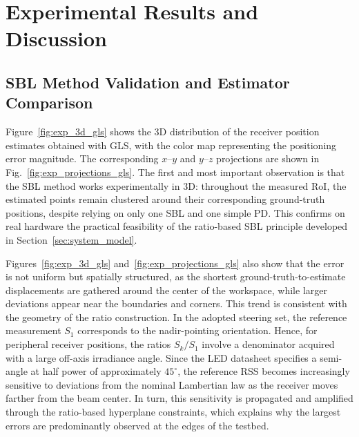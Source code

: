 \documentclass[conference]{IEEEtran}
\begin{document}
\section{Experimental Results and Discussion}
\label{sec:results}


\subsection{SBL Method Validation and Estimator Comparison}
\label{subsec:sbl_validation_gls_wls}

Figure~\ref{fig:exp_3d_gls} shows the 3D distribution of the receiver position estimates obtained with GLS, with the color map representing the positioning error magnitude. The corresponding $x$--$y$ and $y$--$z$ projections are shown in Fig.~\ref{fig:exp_projections_gls}. The first and most important observation is that the SBL method works experimentally in 3D: throughout the measured RoI, the estimated points remain clustered around their corresponding ground-truth positions, despite relying on only one SBL and one simple PD. This confirms on real hardware the practical feasibility of the ratio-based SBL principle developed in Section~\ref{sec:system_model}.

Figures~\ref{fig:exp_3d_gls} and~\ref{fig:exp_projections_gls} also show that the error is not uniform but spatially structured, as the shortest ground-truth-to-estimate displacements are gathered around the center of the workspace, while larger deviations appear near the boundaries and corners. This trend is consistent with the geometry of the ratio construction. In the adopted steering set, the reference measurement $S_{1}$ corresponds to the nadir-pointing orientation. Hence, for peripheral receiver positions, the ratios $S_{k}/S_{1}$ involve a denominator acquired with a large off-axis irradiance angle. Since the LED datasheet specifies a semi-angle at half power of approximately $45^\circ$, the reference RSS becomes increasingly sensitive to deviations from the nominal Lambertian law as the receiver moves farther from the beam center. In turn, this sensitivity is propagated and amplified through the ratio-based hyperplane constraints, which explains why the largest errors are predominantly observed at the edges of the testbed.
\end{document}
